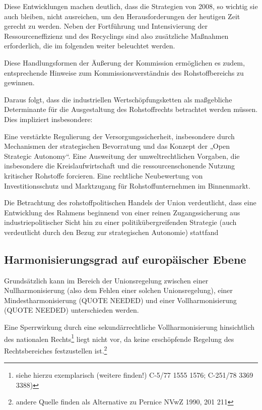 \documentclass[12pt,a4paper,oneside]{book} %
\begin{document}
Diese Entwicklungen machen deutlich, dass die Strategien von 2008, so wichtig sie auch bleiben, nicht ausreichen, um den Herausforderungen der heutigen Zeit gerecht zu werden. Neben der Fortführung und Intensivierung der Ressourceneffizienz und des Recyclings sind also zusätzliche Maßnahmen erforderlich, die im folgenden weiter beleuchtet werden.
	
Diese Handlungsformen der Äußerung der Kommission ermöglichen es zudem, entsprechende Hinweise zum Kommissionsverständnis des Rohstoffbereichs zu gewinnen.

Daraus folgt, dass die industriellen Wertschöpfungsketten als maßgebliche Determinante für die Ausgestaltung des Rohstoffrechts betrachtet werden müssen. Dies impliziert insbesondere:

Eine verstärkte Regulierung der Versorgungssicherheit, insbesondere durch Mechanismen der strategischen Bevorratung und das Konzept der „Open Strategic Autonomy“.
Eine Ausweitung der umweltrechtlichen Vorgaben, die insbesondere die Kreislaufwirtschaft und die ressourcenschonende Nutzung kritischer Rohstoffe forcieren.
Eine rechtliche Neubewertung von Investitionsschutz und Marktzugang für Rohstoffunternehmen im Binnenmarkt.

Die Betrachtung des rohstoffpolitischen Handels der Union verdeutlicht, dass eine Entwicklung des Rahmens beginnend von einer reinen Zugangssicherung aus industriepolitischer Sicht hin zu einer politikübergreifenden Strategie (auch verdeutlicht durch den Bezug zur \glqq strategischen Autonomie\grqq) stattfand
	
\subsection{Harmonisierungsgrad auf europäischer Ebene}
Grundsätzlich kann im Bereich der Unionsregelung zwischen einer Nullharmonisierung (also dem Fehlen einer solchen Unionsregelung), einer Mindestharmonisierung (QUOTE NEEDED) und einer Vollharmonisierung (QUOTE NEEDED) unterschieden werden. 
	
	
Eine Sperrwirkung durch eine sekundärrechtliche Vollharmonisierung hinsichtlich des nationalen Rechts\footnote{siehe hierzu exemplarisch (weitere finden!) C-5/77 1555 1576; C-251/78 3369 3388)} liegt nicht vor, da keine erschöpfende Regelung des Rechtsbereiches festzustellen ist.\footnote{andere Quelle finden als Alternative zu Pernice NVwZ 1990, 201 211}
	
\end{document}
